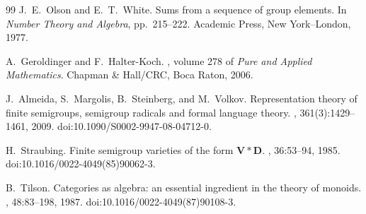 \documentclass[11pt]{article}
\numberwithin{equation}{section}
\theoremstyle{plain}
\theoremstyle{definition}
\theoremstyle{remark}
\theoremstyle{plain}
\begin{document}
\begin{thebibliography}{99}
J.~E.~Olson and E.~T.~White.
\newblock Sums from a sequence of group elements.
\newblock In \emph{Number Theory and Algebra}, pp.~215--222.
Academic Press, New York--London, 1977.

A.~Geroldinger and F.~Halter-Koch.
, volume 278 of {\em Pure and Applied Mathematics}.
\newblock Chapman \& Hall/CRC, Boca Raton, 2006.

J.~Almeida, S.~Margolis, B.~Steinberg, and M.~Volkov.
\newblock Representation theory of finite semigroups, semigroup radicals and
formal language theory.
,
361(3):1429--1461, 2009.
\newblock doi:10.1090/S0002-9947-08-04712-0.

H.~Straubing.
\newblock Finite semigroup varieties of the form $\mathbf V*\mathbf D$.
, 36:53--94, 1985.
\newblock doi:10.1016/0022-4049(85)90062-3.

B.~Tilson.
\newblock Categories as algebra: an essential ingredient in the theory of monoids.
, 48:83--198, 1987.
\newblock doi:10.1016/0022-4049(87)90108-3.

\end{thebibliography}
\normalsize
\end{document}
